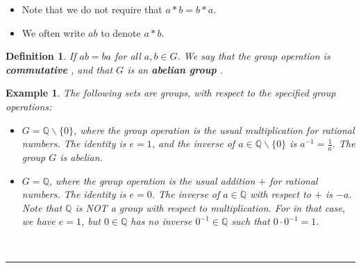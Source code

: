 \documentclass[a4paper,12pt]{report}
\newcounter{statement}
\numberwithin{statement}{chapter}
\newtheorem{defn}[statement]{Definition}
\newtheorem{eg}[statement]{\bf Example}
\numberwithin{equation}{chapter}
\numberwithin{section}{chapter}
\numberwithin{subsection}{section}
\begin{document}
\begin{itemize}
\item 
Note that we do not require that $a* b = b * a$.
  
\item 
We often write $ab$ to denote $a* b$.
  \end{itemize}

\begin{defn}
If $ab = ba$ for all $a, b \in G$. We say that the group operation is
 {\bf commutative} , and that $G$ is an  {\bf abelian group} .
\end{defn}

\begin{eg}
The following sets are groups, with respect to the specified group operations:
\begin{itemize}
\item 
$G = \mathbb{Q} \backslash \{0\}$, where the group operation is the usual multiplication for rational numbers.
The identity is $e = 1$, and the inverse of $a \in \mathbb{Q}\backslash\{0\}$ is $a^{-1} = \frac{1}{a}$.
The group $G$ is abelian.
  
\item 
$G = \mathbb{Q}$, where the group operation is the usual addition $+$ for rational numbers. The identity is $e = 0$.
The inverse of $a \in \mathbb{Q}$ with respect to $+$ is $-a$.
Note that $\mathbb{Q}$ is  {\it NOT}  a group with respect to multiplication. For in that case, we have $e = 1$, but $0 \in \mathbb{Q}$ has no inverse
$0^{-1} \in \mathbb{Q}$ such that $0\cdot 0^{-1} = 1$.
  \end{itemize}





\quad\\\hrule
\quad\\

\end{eg}
\end{document}
